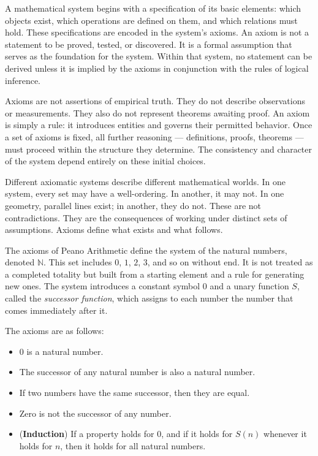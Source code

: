 A mathematical system begins with a specification of its basic elements: which objects exist, which operations are defined on them, and which relations must hold. These specifications are encoded in the system's axioms. An axiom is not a statement to be proved, tested, or discovered. It is a formal assumption that serves as the foundation for the system. Within that system, no statement can be derived unless it is implied by the axioms in conjunction with the rules of logical inference.

Axioms are not assertions of empirical truth. They do not describe observations or measurements. They also do not represent theorems awaiting proof. An axiom is simply a rule: it introduces entities and governs their permitted behavior. Once a set of axioms is fixed, all further reasoning — definitions, proofs, theorems — must proceed within the structure they determine. The consistency and character of the system depend entirely on these initial choices.

Different axiomatic systems describe different mathematical worlds. In one system, every set may have a well-ordering. In another, it may not. In one geometry, parallel lines exist; in another, they do not. These are not contradictions. They are the consequences of working under distinct sets of assumptions. Axioms define what exists and what follows.

The axioms of Peano Arithmetic define the system of the natural numbers, denoted $\mathbb{N}$. This set includes $0$, $1$, $2$, $3$, and so on without end. It is not treated as a completed totality but built from a starting element and a rule for generating new ones. The system introduces a constant symbol $0$ and a unary function $S$, called the \emph{successor function}, which assigns to each number the number that comes immediately after it.

The axioms are as follows:

\begin{itemize}
  \item $0$ is a natural number.
  
  \item The successor of any natural number is also a natural number.

  \item If two numbers have the same successor, then they are equal. 

  \item Zero is not the successor of any number.

  \item (\textbf{Induction}) If a property holds for $0$, and if it holds for $S(n)$ whenever it holds for $n$, then it holds for all natural numbers.
\end{itemize}

